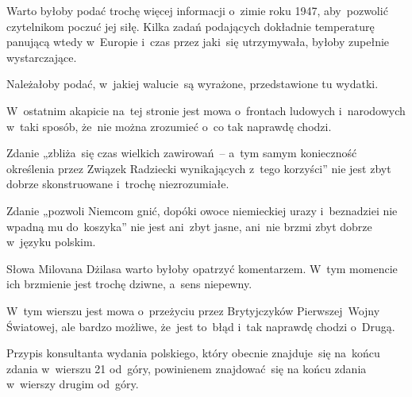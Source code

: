 \documentclass[a4paper,11pt]{article}
\begin{document}
\start {} Warto byłoby podać trochę więcej informacji o~zimie
roku 1947, aby~pozwolić czytelnikom poczuć jej siłę. Kilka zadań
podających dokładnie temperaturę panującą wtedy w~Europie i~czas przez
jaki~się utrzymywała, byłoby zupełnie wystarczające.

\vspace{\spaceFour}



\start {} Należałoby podać, w~jakiej walucie~są wyrażone,
przedstawione tu wydatki.

\vspace{\spaceFour}



\start {} W~ostatnim akapicie na~tej stronie jest mowa
o~frontach ludowych i~narodowych w~taki sposób, że~nie można zrozumieć
o~co tak naprawdę chodzi.

\vspace{\spaceFour}



\start {} Zdanie „zbliża~się czas wielkich zawirowań~--
a~tym samym konieczność określenia przez Związek Radziecki
wynikających z~tego korzyści” nie jest zbyt dobrze skonstruowane
i~trochę niezrozumiałe.

\vspace{\spaceFour}



\start {} Zdanie „pozwoli Niemcom gnić, dopóki owoce
niemieckiej urazy i~beznadziei nie wpadną mu do~koszyka” nie jest
ani~zbyt jasne, ani~nie brzmi zbyt dobrze w~języku polskim.

\vspace{\spaceFour}



\start {} Słowa Milovana Dżilasa warto byłoby opatrzyć
komentarzem. W~tym momencie ich brzmienie jest trochę dziwne, a~sens
niepewny.

\vspace{\spaceFour}



\start {} W~tym wierszu jest mowa o~przeżyciu przez
Brytyjczyków Pierwszej~Wojny Światowej, ale bardzo możliwe, że~jest
to~błąd i~tak naprawdę chodzi o~Drugą.

\vspace{\spaceFour}



\start {} Przypis konsultanta wydania polskiego, który obecnie
znajduje~się na~końcu zdania w~wierszu 21 od~góry, powinienem
znajdować~się na końcu zdania w~wierszy drugim od~góry.
\end{document}
